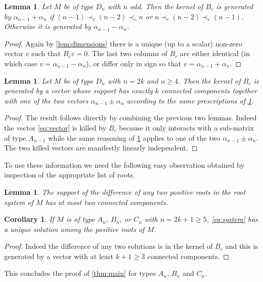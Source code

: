 \documentclass[11pt]{amsart}
\newcommand{\A}{{M}}
\newtheorem{corollary}[theorem]{Corollary}
\newtheorem{lemma}[theorem]{Lemma}
\theoremstyle{definition}
\numberwithin{equation}{section}
\numberwithin{figure}{section}
\begin{document}
  \begin{lemma}
    \label{lem:ker_Dn_even}
    Let $\A$ be of type $D_n$ with $n$ odd.
    Then the kernel of $B_c$ is generated by $\alpha_{n-1}+\alpha_n$ if $(n-1) \prec_c (n-2) \prec_c n$ or $n \prec_c (n-2) \prec_c (n-1)$.
    Otherwise it is generated by $\alpha_{n-1}-\alpha_n$.
  \end{lemma}
  \begin{proof}
    Again by \cref{lem:dimensions} there is a unique (up to a scalar) non-zero vector $v$ such that $B_cv=0$.
    The last two columns of $B_c$ are either identical (in which case $v=\alpha_{n-1}-\alpha_n$), or differ only in sign so that $v=\alpha_{n-1}+\alpha_n$.
  \end{proof}

  \begin{lemma}
    Let $\A$ be of type $D_n$ with $n=2k$ and $n\geq 4$.
    Then the kernel of $B_c$ is generated by a vector whose support \say[PT]{} has exactly $k$ connected components together with one of the two vectors $\alpha_{n-1}\pm\alpha_n$ according to the same prescriptions of \cref{lem:ker_Dn_even}.
  \end{lemma}
  \begin{proof}
    The result follows directly by combining the previous two lemmas. 
    Indeed the vector \cref{eq:vector} is killed by $B_c$ because it only interacts with a sub-matrix of type $A_{n-1}$ while the same reasoning of \cref{lem:ker_Dn_even} applies to one of the two $\alpha_{n-1}\pm\alpha_n$.
    The two killed vectors are manifestly linearly independent.
  \end{proof}

  To use these information we need the following easy observation obtained by inspection of the appropriate list of roots.
  \begin{lemma}
    The support \say[PT]{} of the difference of any two positive roots in the root system of $\A$ has at most two connected components.
  \end{lemma}

  \begin{corollary}
    If $\A$ is of type $A_n$, $B_n$, or $C_n$ with $n=2k+1\geq 5$, \cref{eq:system} has a unique solution among the positive roots of $\A$.
  \end{corollary}
  \begin{proof}
    Indeed the difference of any two solutions is in the kernel of $B_c$ and this is generated by a vector with at least $k+1\geq3$ connected components.
  \end{proof}
  This concludes the proof of \cref{thm:main} for types $A_n$, $B_n$ and $C_n$.
\end{document}
